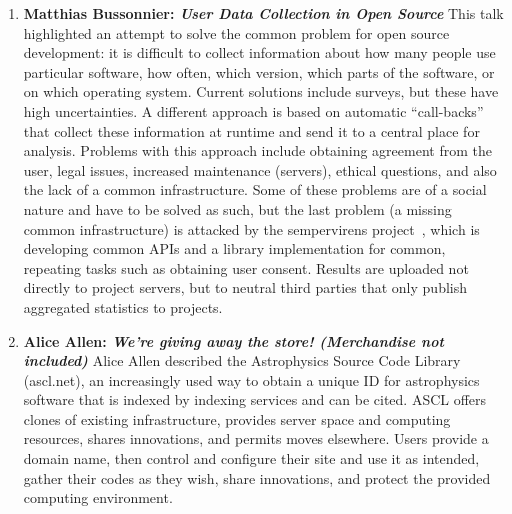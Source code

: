 \documentclass[11pt, oneside]{amsart}
\begin{document}
\begin{enumerate}
\item \textbf{Matthias Bussonnier: \textit{User Data Collection in Open Source}}
This talk highlighted an attempt to solve the common problem for open source
development: it is difficult to collect information about how many people use
particular software, how often, which version, which parts of the software, or
on which operating system. Current solutions include surveys, but these have
high uncertainties. A different approach is based on automatic ``call-backs''
that collect these information at runtime and send it to a central place for
analysis. Problems with this approach include obtaining agreement from the user,
legal issues, increased maintenance (servers), ethical questions, and also the
lack of a common infrastructure. Some of these problems are of a social nature
and have to be solved as such, but the last problem (a missing common
infrastructure) is attacked by the sempervirens project~\cite{sempervirens},
which is developing common APIs and a library implementation for common,
repeating tasks such as obtaining user consent. Results are uploaded not
directly to project servers, but to neutral third parties that only publish
aggregated statistics to projects.

\item \textbf{Alice Allen: \textit{We're giving away the store! (Merchandise not
included)}} Alice Allen described the Astrophysics Source Code Library
(ascl.net), an increasingly used way to obtain a unique ID for astrophysics
software that is indexed by indexing services and can be cited. ASCL offers
clones of existing infrastructure, provides server space and computing
resources, shares innovations, and permits moves elsewhere. Users provide a
domain name, then control and configure their site and use it as intended,
gather their codes as they wish, share innovations, and protect the provided
computing environment.


\end{enumerate}
\end{document}
